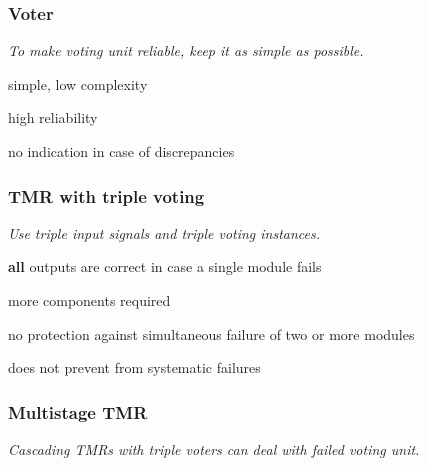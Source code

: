 \documentclass[
  10pt,
  a4paper,
  twocolumn]{article}
\begin{document}
\subsubsection{Voter}\label{voter}

{\small\textit{To make voting unit reliable, keep it as simple as possible.}}

\begin{center}

\end{center}

{\small\begin{description}[parsep=0mm,labelsep=2pt,labelwidth=10pt]
  \item[\color{OliveGreen}\faPlus] simple, low complexity
  \item[\color{OliveGreen}\faPlus] high reliability
  \item[\color{BrickRed}\faMinus] no indication in case of discrepancies
\end{description}}

\subsubsection{TMR with triple voting}\label{tmr-with-triple-voting}

{\small\textit{Use triple input signals and triple voting instances.}}

\begin{center}

\end{center}

{\small\begin{description}[parsep=0mm,labelsep=2pt,labelwidth=10pt]
  \item[\color{OliveGreen}\faPlus] \textbf{all} outputs are correct in case a single module fails
  \item[\color{BrickRed}\faMinus] more components required
  \item[\color{BrickRed}\faMinus] no protection against simultaneous failure of two or more modules
  \item[\color{BrickRed}\faMinus] does not prevent from systematic failures
\end{description}}

\subsubsection{Multistage TMR}\label{multistage-tmr}

{\small\textit{Cascading TMRs with triple voters can deal with failed voting unit.}}
\end{document}
